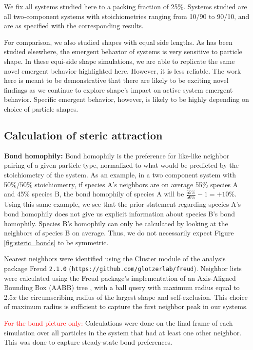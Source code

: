 We fix all systems studied here to a packing fraction of 25\%.
Systems studied are all two-component systems with stoichiometries ranging from 10/90 to 90/10, and are as specified with the corresponding results.

For comparison, we also studied shapes with equal side lengths.
As has been studied elsewhere, the emergent behavior of systems is very sensitive to particle shape.
In these equi-side shape simulations, we are able to replicate the same novel emergent behavior highlighted here.
However, it is less reliable.
The work here is meant to be demonstrative that there are likely to be exciting novel findings as we continue to explore shape's impact on active system emergent behavior.
Specific emergent behavior, however, is likely to be highly depending on choice of particle shapes.


\subsection{Calculation of steric attraction}

\textbf{Bond homophily:} Bond homophily is the preference for like-like neighbor pairing of a given particle type, normalized to what would be predicted by the stoichiometry of the system.
As an example, in a two component system with 50\%/50\% stoichiometry, if species A's neighbors are on average 55\% species A and 45\% species B, the bond homophily of species A will be $\frac{55\%}{50\%}-1=+10\%$.
Using this same example, we see that the prior statement regarding species A's bond homophily does not give us explicit information about species B's bond homophily.
Species B's homophily can only be calculated by looking at the neighbors of species B on average.
Thus, we do not necessarily expect Figure \ref{fig:steric_bonds} to be symmetric.

Nearest neighbors were identified using the Cluster module of the analysis package Freud \verb|2.1.0| (\verb|https://github.com/glotzerlab/freud|)\cite{freud}.
Neighbor lists were calculated using the Freud package's implementation of an Axis-Aligned Bounding Box (AABB) tree \cite{Howard_2016_CompPhys}, with a ball query with maximum radius equal to 2.5$x$ the circumscribing radius of the largest shape and self-exclusion.
This choice of maximum radius is sufficient to capture the first neighbor peak in our systems.

\textcolor{red}{For the bond picture only:}
Calculations were done on the final frame of each simulation over all particles in the system that had at least one other neighbor.
This was done to capture steady-state bond preferences.

